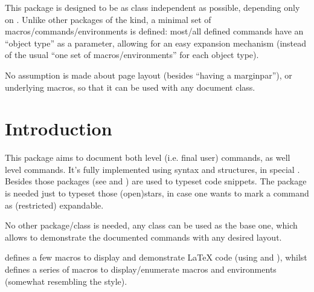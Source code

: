 \documentclass{article}
\begin{document}

  
\begin{typesetabstract}

This package is designed to be as class independent as possible, depending only on . Unlike other packages of the kind, a minimal set of macros/commands/environments is defined: most/all defined commands have an ``object type'' as a  parameter, allowing for an easy expansion mechanism (instead of the usual ``one set of macros/environments'' for each object type).

No assumption is made about page layout (besides ``having a marginpar''),  or underlying macros, so that it can be used with any document class.

\end{typesetabstract}

\tableofcontents

\section{Introduction}


This package aims to document both  level (i.e. final user) commands, as well  level commands. It's fully implemented using  syntax and structures, in special . Besides those  packages (see \cite{SCONTENTS} and \cite{listings}) are used to typeset code snippets. The package  is needed just to typeset those (open)stars, in case one wants to mark a command as (restricted) expandable.
 
 
No other package/class is needed, any class can be used as the base one, which allows to demonstrate the documented commands with any desired layout.

 defines a few macros to display and demonstrate \LaTeX{} code (using  and ), whilst  defines a series of macros to display/enumerate macros and environments (somewhat resembling the  style).
\end{document}
